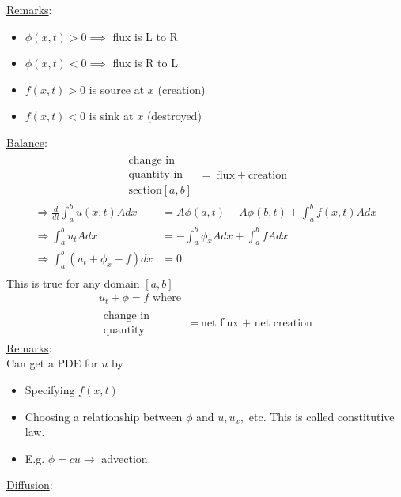 \documentclass[12pt, letterpaper]{article}
\begin{document}
\underline{Remarks}:
\begin{itemize}
    \item $\phi(x,t) > 0 \implies $ flux is L to R 
    \item $\phi(x,t) < 0 \implies $ flux is R to L 
    \item $f(x,t) > 0$ is source at $x$ (creation)
    \item $f(x,t) < 0$ is sink at $x$ (destroyed)
\end{itemize}
\underline{Balance}: 
\begin{align*}
    \begin{matrix}
        \text{change in} \\ \text{quantity in} \\ \text{section} [a,b]
    \end{matrix}\ =\ 
    \text{flux} + \text{creation}
\end{align*}
\begin{align*}
    \Rightarrow \frac{d}{dt} \int_{a}^{b}u(x,t)Adx &= A \phi(a,t) - A \phi(b,t) + \int_{a}^{b}f(x,t)Adx \\
    \Rightarrow \int_{a}^{b} u_t Adx &= -\int_{a}^{b}\phi_x Adx + \int_{a}^{b}fAdx \\
    \Rightarrow \int_{a}^{b}(u_t + \phi_x - f)dx &= 0 \\
\end{align*}
This is true for any domain $[a,b]$
\begin{align*}
    u_t + \phi = f \text{ where}\\
    \begin{matrix}
        \text{change in} \\ \text{quantity}
    \end{matrix}\ &= \ \text{net flux + net creation}
\end{align*}
\underline{Remarks}: \\
Can get a PDE for $u$ by
\begin{itemize}
    \item Specifying $f(x,t)$
    \item Choosing a relationship between $\phi$ and $u,u_x,$ etc. This is called constitutive law.
    \item E.g. $\phi = cu \rightarrow$ advection.
\end{itemize}
\underline{Diffusion}:
\end{document}
